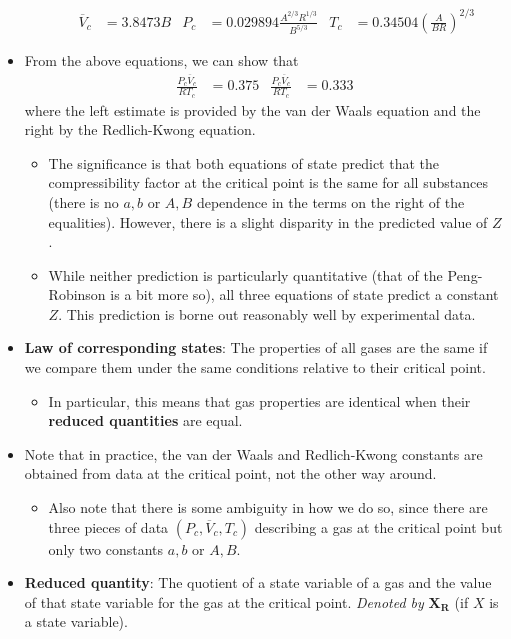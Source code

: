 \documentclass[../notes.tex]{subfiles}
\begin{document}
\begin{itemize}
\begin{itemize}
        \begin{align*}
            \overline{V}_c &= 3.8473B&
            P_c &= 0.029894\frac{A^{2/3}R^{1/3}}{B^{5/3}}&
            T_c &= 0.34504\left( \frac{A}{BR} \right)^{2/3}
        \end{align*}
    \end{itemize}
    \item From the above equations, we can show that
    \begin{align*}
        \frac{P_c\overline{V}_c}{RT_c} &= 0.375&
        \frac{P_c\overline{V}_c}{RT_c} &= 0.333
    \end{align*}
    where the left estimate is provided by the van der Waals equation and the right by the Redlich-Kwong equation.
    \begin{itemize}
        \item The significance is that both equations of state predict that the compressibility factor at the critical point is the same for all substances (there is no $a,b$ or $A,B$ dependence in the terms on the right of the equalities). However, there is a slight disparity in the predicted value of $Z$.
        \item While neither prediction is particularly quantitative (that of the Peng-Robinson is a bit more so), all three equations of state predict a constant $Z$. This prediction is borne out reasonably well by experimental data.
    \end{itemize}
    \item \textbf{Law of corresponding states}: The properties of all gases are the same if we compare them under the same conditions relative to their critical point.
    \begin{itemize}
        \item In particular, this means that gas properties are identical when their \textbf{reduced quantities} are equal.
    \end{itemize}
    \item Note that in practice, the van der Waals and Redlich-Kwong constants are obtained from data at the critical point, not the other way around.
    \begin{itemize}
        \item Also note that there is some ambiguity in how we do so, since there are three pieces of data $(P_c,\overline{V}_c,T_c)$ describing a gas at the critical point but only two constants $a,b$ or $A,B$.
    \end{itemize}
    \item {}\textbf{Reduced quantity}: The quotient of a state variable of a gas and the value of that state variable for the gas at the critical point. \emph{Denoted by} $\bm{X_R}$ (if $X$ is a state variable).

\end{itemize}
\end{document}
